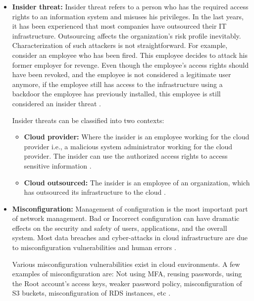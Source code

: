 \begin{itemize}
    \item \textbf{Insider threat:} Insider threat refers to a person who has the required access rights to an
    information system and misuses his privileges.
    In the last years, it has been experienced that most companies have outsourced their IT infrastructure.
    Outsourcing affects the organization’s risk profile inevitably.
    Characterization of such attackers is not straightforward.
    For example, consider an employee who has been fired.
    This employee decides to attack his former employer for revenge.
    Even though the employee's access rights should have been revoked, and the employee is not considered a
    legitimate user anymore, if the employee still has access to the infrastructure using a backdoor the employee has previously installed, this employee is still considered an insider threat \cite{46}.

    Insider threats can be classified into two contexts:
    \begin{itemize}
        \item \textbf{Cloud provider:} Where the insider is an employee working for the cloud provider i.e., a
        malicious system administrator working for the cloud provider.
        The insider can use the authorized access
        rights to access sensitive information \cite{46}.
    \end{itemize}
    \begin{itemize}
        \item \textbf{Cloud outsourced:} The insider is an employee of an organization, which has outsourced its
        infrastructure to the cloud \cite{46}.
    \end{itemize}
\end{itemize}

\begin{itemize}
    \item \textbf{Misconfiguration:} Management of configuration is the most important part of network management.
    Bad or Incorrect configuration can have dramatic effects on the security and safety of users, applications, and the overall system. Most data breaches and cyber-attacks in cloud infrastructure are due to misconfiguration vulnerabilities and human errors \cite{44}.

    Various misconfiguration vulnerabilities exist in cloud environments.
    A few examples of misconfiguration are: Not
    using MFA, reusing passwords, using the Root account’s access keys, weaker password policy, misconfiguration of S3
    buckets,  misconfiguration of RDS
    instances, etc \cite{45}.
\end{itemize}

